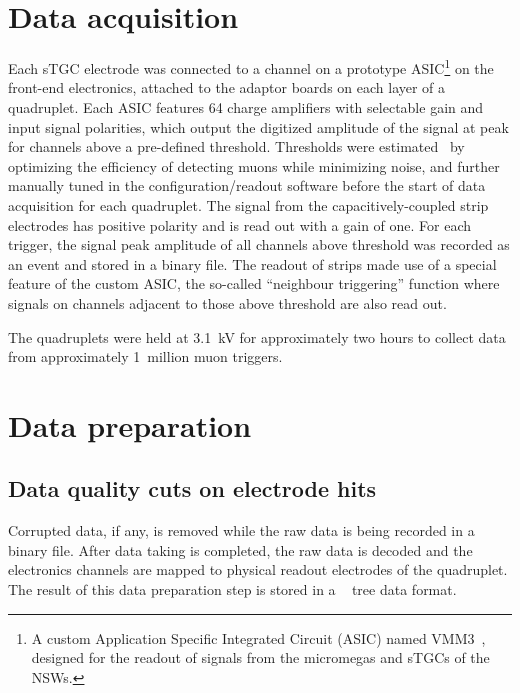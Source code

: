 \section{Data acquisition}
Each sTGC electrode was connected to a channel on a prototype ASIC\footnote{A custom Application Specific Integrated Circuit (ASIC) named VMM3~\cite{iakovidis_vmm3_2017}, designed for the readout of signals from the micromegas and sTGCs of the NSWs.} on the front-end electronics, attached to the adaptor boards on each layer of a quadruplet. Each ASIC features 64 charge amplifiers with selectable gain and input signal polarities, which output the digitized amplitude of the signal at peak for channels above a pre-defined threshold. Thresholds were estimated~\cite{chen_calibration_2019} by optimizing the efficiency of detecting muons while minimizing noise, and further manually tuned in the configuration/readout software before the start of data acquisition for each quadruplet. The signal from the capacitively-coupled strip electrodes has positive polarity and is read out with a gain of one. For each trigger, the signal peak amplitude of all channels above threshold was recorded  as an event and stored in a binary file. The readout of strips made use of a special feature of the custom ASIC, the so-called ``neighbour triggering'' function where signals on channels adjacent to those above threshold are also read out.

The quadruplets were held at 3.1~kV for approximately two hours to collect data from approximately 1~million muon triggers.

\section{Data preparation}
\subsection{Data quality cuts on electrode hits}
\label{subsec:hit_cuts}
Corrupted data, if any, is removed while the raw data is being recorded in a binary file. After data taking is completed, the raw data is decoded and the electronics channels are mapped to physical readout electrodes of the quadruplet. The result of this data preparation step is stored in a ~\cite{ROOT_paper} tree data format. 

